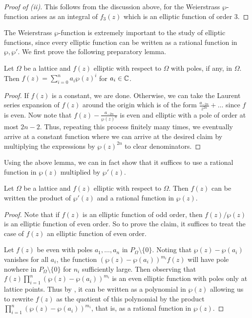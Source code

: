 \begin{proof}[Proof of (ii)]
    This follows from the discussion above, for the Weierstrass $\wp$-function arises as an integral of $f_{3}(z)$ which is an elliptic function of order 3. 
\end{proof}
The Weierstrass $\wp$-function is extremely important to the study of elliptic functions, since every elliptic function can be written as a rational function in $\wp,\wp'$. We first prove the following preparatory lemma. 
\begin{lemma}\label{lem: ellitpic function with poles only in lattice is polynomial in Weierstrass}
    Let $\Omega$ be a lattice and $f(z)$ elliptic with respect to $\Omega$ with poles, if any, in $\Omega$. Then $f(z)=\sum_{i=0}^{n}a_{i}\wp(z)^{i}$ for $a_{i}\in\mathbb{C}$. 
\end{lemma}
\begin{proof}
    If $f(z)$ is a constant, we are done. Otherwise, we can take the Laurent series expansion of $f(z)$ around the origin which is of the form $\frac{a_{-2n}}{z^{2n}}+\dots$ since $f$ is even. Now note that $f(z)-\frac{a_{-2n}}{\wp(z)^{n}}$ is even and elliptic with a pole of order at most $2n-2$. Thus, repeating this process finitely many times, we eventually arrive at a constant function where we can arrive at the desired claim by multiplying the expressions by $\wp(z)^{2n}$ to clear denominators.  
\end{proof}
Using the above lemma, we can in fact show that it suffices to use a rational function in $\wp(z)$ multiplied by $\wp'(z)$. 
\begin{proposition}\label{prop: elliptic functions in terms of Weierstrass}
    Let $\Omega$ be a lattice and $f(z)$ elliptic with respect to $\Omega$. Then $f(z)$ can be written the product of $\wp'(z)$ and a rational function in $\wp(z)$. 
\end{proposition}
\begin{proof}
    Note that if $f(z)$ is an elliptic function of odd order, then $f(z)/\wp(z)$ is an elliptic function of even order. So to prove the claim, it suffices to treat the case of $f(z)$ an elliptic function of even order. 

    Let $f(z)$ be even with poles $a_{1},\dots,a_{n}$ in $P_{\Omega}\setminus\{0\}$. Noting that $\wp(z)-\wp(a_{i})$ vanishes for all $a_{i}$, the function $(\wp(z)-\wp(a_{i}))^{m_{i}}f(z)$ will have pole nowhere in $P_{\Omega}\setminus\{0\}$ for $n_{i}$ sufficiently large. Then observing that $f(z)\prod_{i=1}^{n}(\wp(z)-\wp(a_{i}))^{m_{i}}$ is an even elliptic function with poles only at lattice points. Thus by , it can be written as a polynomial in $\wp(z)$ allowing us to rewrite $f(z)$ as the quotient of this polynomial by the product $\prod_{i=1}^{n}(\wp(z)-\wp(a_{i}))^{m_{i}}$, that is, as a rational function in $\wp(z)$. 
\end{proof}
